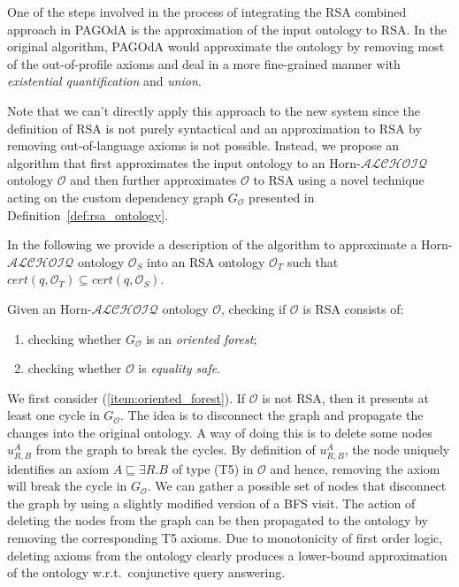 \documentclass[runningheads]{llncs}
\newcommand{\alchoiq}{$\mathcal{ALCHOIQ}$\xspace}
\newcommand{\hornalchoiq}{Horn-\alchoiq\xspace}
\newcommand{\pagoda}{\mbox{PAGOdA}\xspace}
\begin{document}
One of the steps involved in the process of integrating the RSA combined approach in \pagoda is the approximation of the input ontology to RSA.
In the original algorithm, \pagoda would approximate the ontology by removing most of the out-of-profile axioms and deal in a more fine-grained manner with \emph{existential quantification} and \emph{union}.

Note that we can't directly apply this approach to the new system since the definition of RSA is not purely syntactical and an approximation to RSA by removing out-of-language axioms is not possible.
Instead, we propose an algorithm that first approximates the input ontology to an \hornalchoiq ontology $\mathcal{O}$ and then further approximates $\mathcal{O}$ to RSA using a novel technique acting on the custom dependency graph $G_\mathcal{O}$ presented in Definition~\ref{def:rsa_ontology}.

In the following we provide a description of the algorithm to approximate a \hornalchoiq ontology $\mathcal{O}_S$ into an RSA ontology $\mathcal{O}_T$ such that $\textit{cert}(q,\mathcal{O}_T) \subseteq \textit{cert}(q,\mathcal{O}_S)$.

Given an \hornalchoiq ontology $\mathcal{O}$, checking if $\mathcal{O}$ is RSA consists of:
\begin{enumerate}
    \item\label{item:oriented_forest}
        checking whether $G_\mathcal{O}$ is an \emph{oriented forest};
    \item\label{item:equality_safe}
        checking whether $\mathcal{O}$ is \emph{equality safe}.
\end{enumerate}

We first consider (\ref{item:oriented_forest}).
If $\mathcal{O}$ is not RSA, then it presents at least one cycle in $G_\mathcal{O}$.
The idea is to disconnect the graph and propagate the changes into the original ontology.
A way of doing this is to delete some nodes $u^A_{R,B}$ from the graph to break the cycles.
By definition of $u^A_{R,B}$, the node uniquely identifies an axiom $A \sqsubseteq \exists R . B$ of type (T5) in $\mathcal{O}$ and hence, removing the axiom will break the cycle in $G_\mathcal{O}$.
We can gather a possible set of nodes that disconnect the graph by using a slightly modified version of a BFS visit.
The action of deleting the nodes from the graph can be then propagated to the ontology by removing the corresponding T5 axioms.
Due to monotonicity of first order logic, deleting axioms from the ontology clearly produces a lower-bound approximation of the ontology w.r.t.\ conjunctive query answering.
\end{document}
